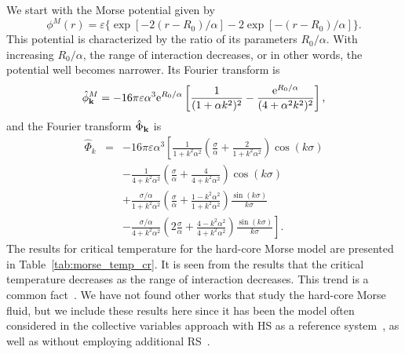 We start with the Morse potential given by
\begin{equation}
	\phi^M(r) = \varepsilon \{\exp{[-2(r-R_0)/\alpha]}-2\exp{[-(r-R_0)/\alpha]}\}.
\end{equation}
This potential is characterized by the ratio of its parameters $R_0/\alpha$. With increasing $R_0/\alpha$, the range of interaction decreases, or in other words, the potential well becomes narrower.
Its Fourier transform is
\begin{equation*}
	\hat{\phi}^M_{\vb k} = -16\pi\varepsilon\alpha^3 {\rm e}^{R_0/\alpha} 
	\left[\frac{1}{(1 + \alpha k^2)^2} - \frac{{\rm e}^{R_0/\alpha}}{(4 + \alpha^2 k^2)^2}\right],
\end{equation*}
and the Fourier transform $\hat{\Phi}_{\vb k}$ is
\begin{eqnarray*}
	\label{eq:part_morse_fourier}
	\hat{\Phi}_k &=& -16\pi \varepsilon \alpha^3 
	\left[
	\frac{1}{1+k^2\alpha^2}\left(\frac{\sigma}{\alpha} + \frac{2}{1+k^2\alpha^2}\right) \cos(k\sigma)
	\right.
	\nonumber\\
	&& \left.
	-\frac{1}{4 + k^2\alpha^2} \left(\frac{\sigma}{\alpha} + \frac{4}{4 + k^2\alpha^2}\right) \cos(k\sigma)
	\right.
	\nonumber \\
	&& \left.
	+ \frac{\sigma/\alpha}{1 + k^2\alpha^2} \left(\frac{\sigma}{\alpha} + \frac{1 - k^2\alpha^2}{1 + k^2 \alpha^2}\right) \frac{\sin(k\sigma)}{k\sigma}
	\right.
	\nonumber\\
	&& \left.
	- \frac{\sigma/\alpha}{4 + k^2\alpha^2} \left(2\frac{\sigma}{\alpha} + \frac{4 - k^2\alpha^2}{4 + k^2\alpha^2}\right) \frac{\sin(k\sigma)}{k\sigma}
	\right].
\end{eqnarray*}
The results for critical temperature for the hard-core Morse model are presented in Table~\ref{tab:morse_temp_cr}. It is seen from the results that the critical temperature decreases as the range of interaction decreases. This trend is a common fact~\cite{KreiciNezbeda2012,MendoubWaxJakse2010}.
We have not found other works that study the hard-core Morse fluid, but we include these results here since it has been the model often considered in the collective variables approach with HS as a reference system~\cite{Yukh1990,YukhJSP1995,PatsJSP1995}, as well as without employing additional RS~\cite{PylMpkDobUPJ2023b,PylJML2023}.

